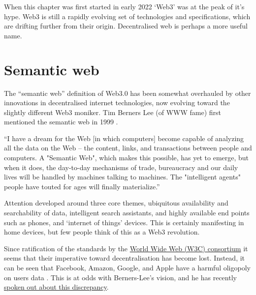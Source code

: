 When this chapter was first started in early 2022 `Web3' was at the peak of it's hype. Web3 is still a rapidly evolving set of technologies and specifications, which are drifting further from their origin. Decentralised web is perhaps a more useful name.%
\section{Semantic web}
The ``semantic web'' definition of Web3.0 has been somewhat overhauled by other innovations in decentralised internet technologies, now evolving toward the slightly different Web3 moniker. Tim Berners Lee (of WWW fame) first mentioned the semantic web in 1999 \cite{semanticWeb}.\par
``I have a dream for the Web [in which computers] become capable of analyzing all the data on the Web – the content, links, and transactions between people and computers. A "Semantic Web", which makes this possible, has yet to emerge, but when it does, the day-to-day mechanisms of trade, bureaucracy and our daily lives will be handled by machines talking to machines. The "intelligent agents" people have touted for ages will finally materialize.''\par
Attention developed around three core themes, ubiquitous availability and searchability of data, intelligent search assistants, and highly available end points such as phones, and `internet of things' devices. This is certainly manifesting in home devices, but few people think of this as a Web3 revolution. 
\begin{comment}
The framework can be seen in Figure \ref{fig:semanticWebStack}.\par
\begin{figure}
  \centering
    \texttt{[image: semanticWebStack]}
  \caption{\href{https://en.wikipedia.org/wiki/Semantic_Web_Stack}{Semantic Web Stack} [CC0 image]}
  \label{fig:semanticWebStack}
\end{figure}
\end{comment}
Since ratification of the standards by the \href{https://www.w3.org/standards/semanticweb/}{World Wide Web (W3C) consortium} it seems that their imperative toward decentralisation has become lost. Instead, it can be seen that Facebook, Amazon, Google, and Apple have a harmful oligopoly on users data \cite{costigan2018world}. This is at odds with Berners-Lee's vision, and he has recently \href{https://thenextweb.com/news/web-inventor-tim-berners-lee-screw-web3-my-decentralized-internet-doesnt-need-blockchain/}{spoken out about this discrepancy}. \par
